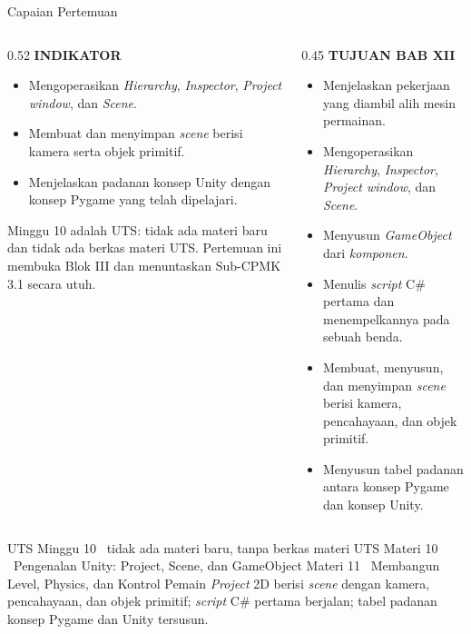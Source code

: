 \documentclass[aspectratio=169,10pt]{beamer}
\begin{document}
\begin{frame}{Capaian Pertemuan}
\begin{columns}[T,onlytextwidth]
\begin{column}{0.52\textwidth}
    {\fontsize{7}{8.5}\selectfont\bfseries\color{ubAccent}INDIKATOR}\par
    \vspace{0.06cm}
    \begin{itemize}
      \item Mengoperasikan \emph{Hierarchy}, \emph{Inspector},
            \emph{Project window}, dan \emph{Scene}.
      \item Membuat dan menyimpan \emph{scene} berisi kamera serta objek
            primitif.
      \item Menjelaskan padanan konsep Unity dengan konsep Pygame yang telah
            dipelajari.
    \end{itemize}
    \vspace{0.06cm}
    \begin{kotak}
      Minggu 10 adalah UTS: tidak ada materi baru dan tidak ada berkas materi
      UTS. Pertemuan ini membuka Blok III dan menuntaskan Sub-CPMK 3.1 secara
      utuh.
    \end{kotak}
  \end{column}
  \begin{column}{0.45\textwidth}
    {\fontsize{7}{8.5}\selectfont\bfseries\color{ubAccent}TUJUAN BAB XII}\par
    \vspace{0.08cm}
    \begin{itemize}
      \item Menjelaskan pekerjaan yang diambil alih mesin permainan.
      \item Mengoperasikan \emph{Hierarchy}, \emph{Inspector},
            \emph{Project window}, dan \emph{Scene}.
      \item Menyusun \emph{GameObject} dari \emph{komponen}.
      \item Menulis \emph{script} C\# pertama dan menempelkannya pada sebuah
            benda.
      \item Membuat, menyusun, dan menyimpan \emph{scene} berisi kamera,
            pencahayaan, dan objek primitif.
      \item Menyusun tabel padanan antara konsep Pygame dan konsep Unity.
    \end{itemize}
  \end{column}
\end{columns}
\end{frame}

  {UTS Minggu 10 \textperiodcentered\ tidak ada materi baru, tanpa berkas
   materi UTS}
  {Materi 10 \textperiodcentered\ Pengenalan Unity: Project, Scene, dan
   GameObject}
  {Materi 11 \textperiodcentered\ Membangun Level, Physics, dan Kontrol
   Pemain}
  {\emph{Project} 2D berisi \emph{scene} dengan kamera, pencahayaan, dan objek
   primitif; \emph{script} C\# pertama berjalan; tabel padanan konsep Pygame
   dan Unity tersusun.}
\end{document}
